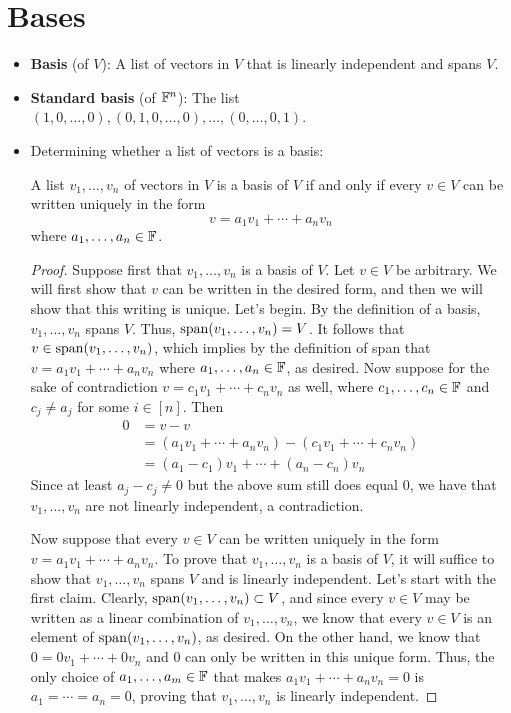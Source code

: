 \documentclass[../main.tex]{subfiles}
\begin{document}
\section{Bases}
\begin{itemize}
    \item \textbf{Basis} (of $V$): A list of vectors in $V$ that is linearly independent and spans $V$.
    \item \textbf{Standard basis} (of $\mathbb{F}^n$): The list $(1,0,\dots,0),(0,1,0,\dots,0),\dots,(0,\dots,0,1)$.
    \item Determining whether a list of vectors is a basis:
    \begin{theorem}\label{trm:basisLinearCombination}
        A list $v_1,\dots,v_n$ of vectors in $V$ is a basis of $V$ if and only if every $v\in V$ can be written uniquely in the form
        \begin{equation*}
            v = a_1v_1+\cdots+a_nv_n
        \end{equation*}
        where $a_1,\dots,a_n\in\mathbb{F}$.
        \begin{proof}
            Suppose first that $v_1,\dots,v_n$ is a basis of $V$. Let $v\in V$ be arbitrary. We will first show that $v$ can be written in the desired form, and then we will show that this writing is unique. Let's begin. By the definition of a basis, $v_1,\dots,v_n$ spans $V$. Thus, $\operatorname{span}(v_1,\dots,v_n)=V$. It follows that $v\in\operatorname{span}(v_1,\dots,v_n)$, which implies by the definition of span that $v=a_1v_1+\cdots+a_nv_n$ where $a_1,\dots,a_n\in\mathbb{F}$, as desired. Now suppose for the sake of contradiction $v=c_1v_1+\cdots+c_nv_n$ as well, where $c_1,\dots,c_n\in\mathbb{F}$ and $c_j\neq a_j$ for some $i\in[n]$. Then
            \begin{align*}
                0 &= v-v\\
                &= (a_1v_1+\cdots+a_nv_n)-(c_1v_1+\cdots+c_nv_n)\\
                &= (a_1-c_1)v_1+\cdots+(a_n-c_n)v_n
            \end{align*}
            Since at least $a_j-c_j\neq 0$ but the above sum still does equal 0, we have that $v_1,\dots,v_n$ are not linearly independent, a contradiction.\par
            Now suppose that every $v\in V$ can be written uniquely in the form $v=a_1v_1+\cdots+a_nv_n$. To prove that $v_1,\dots,v_n$ is a basis of $V$, it will suffice to show that $v_1,\dots,v_n$ spans $V$ and is linearly independent. Let's start with the first claim. Clearly, $\operatorname{span}(v_1,\dots,v_n)\subset V$, and since every $v\in V$ may be written as a linear combination of $v_1,\dots,v_n$, we know that every $v\in V$ is an element of $\operatorname{span}(v_1,\dots,v_n)$, as desired. On the other hand, we know that $0=0v_1+\cdots+0v_n$ and $0$ can only be written in this unique form. Thus, the only choice of $a_1,\dots,a_m\in\mathbb{F}$ that makes $a_1v_1+\cdots+a_nv_n=0$ is $a_1=\cdots=a_n=0$, proving that $v_1,\dots,v_n$ is linearly independent.

\end{proof}
\end{theorem}
\end{itemize}
\end{document}
